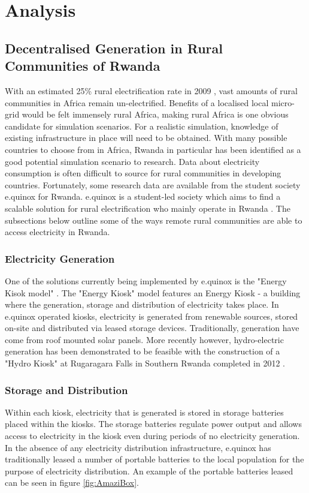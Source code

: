 \chapter*{Analysis}
\label{Analysis}

\section*{Decentralised Generation in Rural Communities of Rwanda}
With an estimated 25\% rural electrification rate in 2009 \cite{IEA-web:2015}, vast amounts of rural communities in Africa remain un-electrified. Benefits of a localised local micro-grid would be felt immensely rural Africa, making rural Africa is one obvious candidate for simulation scenarios. For a realistic simulation, knowledge of existing infrastructure in place will need to be obtained. With many possible countries to choose from in Africa, Rwanda in particular has been identified as a good potential simulation scenario to research. Data about electricity consumption is often difficult to source for rural communities in developing countries. Fortunately, some research data are available from the student society e.quinox for Rwanda. e.quinox is a student-led society which aims to find a scalable solution for rural electrification who mainly operate in Rwanda \cite{e.quinox-web:2015}. The subsections below outline some of the ways remote rural communities are able to access electricity in Rwanda.

\subsection*{Electricity Generation}
One of the solutions currently being implemented by e.quinox is the "Energy Kisok model" \cite{e.quinox-EK-web:2015}. The "Energy Kiosk" model features an Energy Kiosk - a building where the generation, storage and distribution of electricity takes place. In e.quinox operated kiosks, electricity is generated from renewable sources, stored on-site and distributed via leased storage devices. Traditionally, generation have come from roof mounted solar panels. More recently however, hydro-electric generation has been demonstrated to be feasible with the construction of a "Hydro Kiosk" at Rugaragara Falls in Southern Rwanda completed in 2012 \cite{e.quinox-Hydro-web:2015}.

\subsection*{Storage and Distribution}
Within each kiosk, electricity that is generated is stored in storage batteries placed within the kiosks. The storage batteries regulate power output and allows access to electricity in the kiosk even during periods of no electricity generation. In the absence of any electricity distribution infrastructure, e.quinox has traditionally leased a number of portable batteries to the local population for the purpose of electricity distribution. An example of the portable batteries leased can be seen in figure \ref{fig:AmaziBox}.

